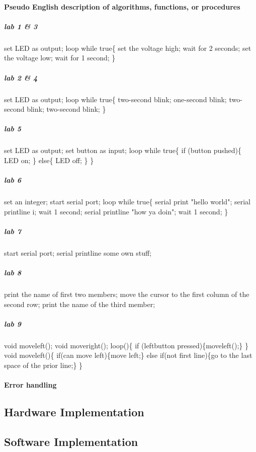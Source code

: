 \paragraph{Pseudo English description of algorithms, functions, or procedures}
\subparagraph{lab 1 \& 3}
set LED as output;
loop while true\{
	set the voltage high;
	wait for 2 seconds;
	set the voltage low;
	wait for 1 second;
\}
\subparagraph{lab 2 \& 4}
set LED as output;
loop while true\{
	two-second blink;
	one-second blink;
	two-second blink;
	two-second blink;
\}
\subparagraph{lab 5}
set LED as output;
set button as input;
loop while true\{
	if (button pushed)\{
		LED on;
	\}
	else\{
		LED off;
	\}
\}
\subparagraph{lab 6}
set an integer;
start serial port;
loop while true\{
	serial print "hello world";
	serial printline i;
	wait 1 second;
	serial printline "how ya doin";
	wait 1 second;
\}
\subparagraph{lab 7}
start serial port;
serial printline some own stuff;
\subparagraph{lab 8}
print the name of first two members;
move the cursor to the first column of the second row;
print the name of the third member;
\subparagraph{lab 9}
void moveleft();
void moveright();
loop()\{
	if (leftbutton pressed)\{moveleft();\}
\}
void moveleft()\{
	if(can move left)\{move left;\}
	else if(not first line)\{go to the last space of the prior line;\}
\}
\paragraph{Error handling}
\subsection{Hardware Implementation}
\subsection{Software Implementation}
